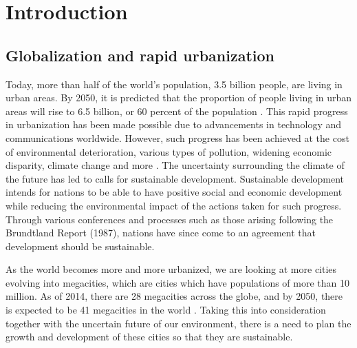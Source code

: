 \documentclass[preprint,12pt,authoryear]{elsarticle}
\begin{document}
	

	






\renewcommand{\cftfigfont}{Figure }
\renewcommand{\cfttabfont}{Table }
\tableofcontents
\listoffigures
\listoftables

\clearpage

\section{Introduction}
\subsection{Globalization and rapid urbanization}
Today, more than half of the world's population, 3.5 billion people, are living in urban areas. By 2050, it is predicted that the proportion of people living in urban areas will rise to 6.5 billion, or 60 percent of the population \citep{wup2014}. This rapid progress in urbanization has been made possible due to advancements in technology and communications worldwide. However, such progress has been achieved at the cost of environmental deterioration, various types of pollution, widening economic disparity, climate change and more \citep{dalal-clayton2002}. The uncertainty surrounding the climate of the future has led to calls for sustainable development. Sustainable development intends for nations to be able to have positive social and economic development while reducing the environmental impact of the actions taken for such progress. Through various conferences and processes such as those arising following the Brundtland Report (1987), nations have since come to an agreement that development should be sustainable. 

As the world becomes more and more urbanized, we are looking at more cities evolving into megacities, which are cities which have populations of more than 10 million. As of 2014, there are 28 megacities across the globe, and by 2050, there is expected to be 41 megacities in the world \citep{wup2014}. Taking this into consideration together with the uncertain future of our environment, there is a need to plan the growth and development of these cities so that they are sustainable. 
\end{document}
